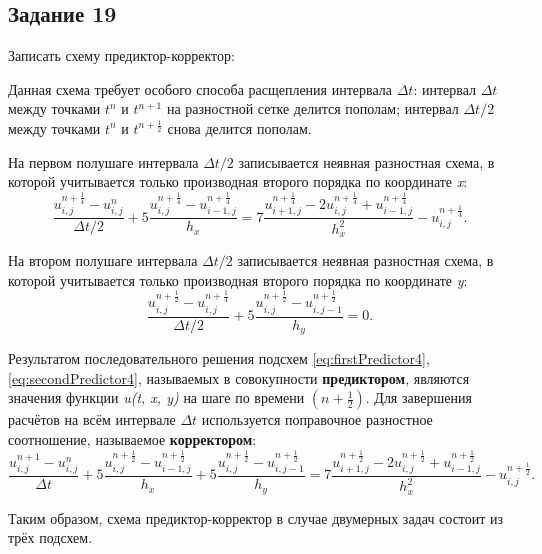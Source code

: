 \documentclass[12pt, a4paper]{report}
\begin{document}
	\subsection*{Задание 19}
	\large
	Записать схему предиктор-корректор: \par
	Данная схема требует особого способа расщепления интервала $\Delta t$: интервал $\Delta t$ между точками $t^{n}$ и $t^{n+1}$ на разностной сетке делится пополам; интервал $\Delta t/2$ между точками $t^{n}$ и $t^{n+\frac{1}{2}}$ снова делится пополам. \par
	На первом полушаге интервала $\Delta t/2$ записывается неявная разностная схема, в которой учитывается только производная второго порядка по координате \textit{x}:
	\begin{equation}\label{eq:firstPredictor4}
		\frac{u_{i, j}^{n+\frac{1}{4}} - u_{i, j}^{n}}{\Delta t/2} + 5\frac{u_{i, j}^{n+\frac{1}{4}} - u_{i-1, j}^{n+\frac{1}{4}}}{h_{x}} = 7\frac{u_{i+1, j}^{n+\frac{1}{4}} - 2u_{i, j}^{n+\frac{1}{4}} + u_{i-1, j}^{n+\frac{1}{4}}}{h_{x}^{2}} - u_{i, j}^{n+\frac{1}{4}}.
	\end{equation}
	\par
	На втором полушаге интервала $\Delta t/2$ записывается неявная разностная схема, в которой учитывается только производная второго порядка по координате \textit{y}:
	\begin{equation}\label{eq:secondPredictor4}
		\frac{u_{i, j}^{n+\frac{1}{2}} - u_{i, j}^{n+\frac{1}{4}}}{\Delta t/2} + 5\frac{u_{i, j}^{n+\frac{1}{2}} - u_{i, j-1}^{n+\frac{1}{2}}}{h_{y}} = 0.
	\end{equation}
	\par
	Результатом последовательного решения подсхем \eqref{eq:firstPredictor4}, \eqref{eq:secondPredictor4}, называемых в совокупности \textbf{предиктором}, являются значения функции \textit{u(t, x, y)} на шаге по времени $(n+\frac{1}{2})$. Для завершения расчётов на всём интервале $\Delta t$ используется поправочное разностное соотношение, называемое \textbf{корректором}:
	\scriptsize
	\begin{equation}\label{eq:corrector4}
		\frac{u_{i, j}^{n+1} - u_{i, j}^{n}}{\Delta t} + 5\frac{u_{i, j}^{n+\frac{1}{2}} - u_{i-1, j}^{n+\frac{1}{2}}}{h_{x}} + 5\frac{u_{i, j}^{n+\frac{1}{2}} - u_{i, j-1}^{n+\frac{1}{2}}}{h_{y}} = 7\frac{u_{i+1, j}^{n+\frac{1}{2}} - 2u_{i, j}^{n+\frac{1}{2}} + u_{i-1, j}^{n+\frac{1}{2}}}{h_{x}^{2}} - u_{i, j}^{n+\frac{1}{2}}.
	\end{equation}
	\large
	\par
	Таким образом, схема предиктор-корректор в случае двумерных задач состоит из трёх подсхем.
\end{document}
